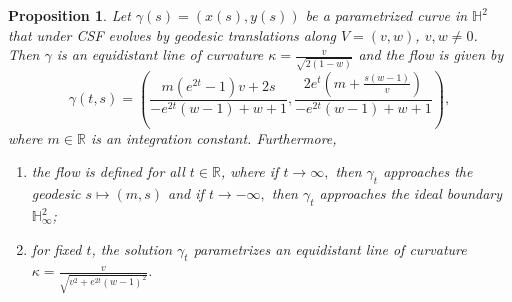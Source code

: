 \documentclass[12pt]{amsart}
\theoremstyle{plain}
\newtheorem{proposition}[theorem]{Proposition}
\theoremstyle{definition}
\def\h{\mathbb H}
\def\r{\mathbb R}
\begin{document}
\begin{proposition}
Let $\gamma(s) = (x(s), y(s))$ be a parametrized curve in $\h^2$ that under CSF evolves by geodesic translations along $V=(v,w)$,  $v,w\not=0$.   Then $\gamma$ is an equidistant line of curvature $\kappa=\frac{v}{\sqrt{2(1-w)}}$ and the flow is given by 
\begin{equation}\label{t2}
\gamma(t,s)= \left(\frac{m \left(e^{2 t}-1\right) v+2 s}{-e^{2 t} (w-1)+w+1},\frac{2 e^t \left(m+\frac{s (w-1)}{v}\right)}{-e^{2 t} (w-1)+w+1}\right),
\end{equation}
 where $m\in\r$ is an integration constant.  Furthermore, 
 \begin{enumerate}
\item the flow is defined for all $t \in\r$, where if $t \to \infty,$ then $\gamma_t$ approaches the geodesic $s\mapsto (m,s)$
and  if $t \to - \infty,$ then $\gamma_t$ approaches the ideal boundary $\h^2_\infty$;
\item for fixed $t$, the solution $\gamma_t$ parametrizes an equidistant line of curvature $\kappa=\frac{v}{\sqrt{v^2+e^{2t}(w-1)^2}}$. 
\end{enumerate}\end{proposition}
\end{document}
